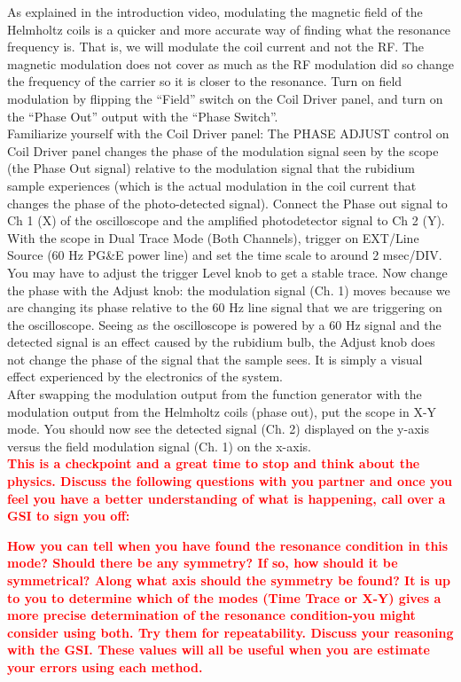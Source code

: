\documentclass{../lab}
\begin{document}
As explained in the introduction video, modulating the magnetic field of the Helmholtz coils is a quicker and more accurate way of finding what the resonance frequency is. That is, we will modulate the coil current and not the RF. The magnetic modulation does not cover as much as the RF modulation did so change the frequency of the carrier so it is closer to the resonance. Turn on field modulation by flipping the ``Field'' switch on the Coil Driver panel, and turn on the ``Phase Out'' output with the ``Phase Switch''. \\

Familiarize yourself with the Coil Driver panel: The PHASE ADJUST control on Coil Driver panel changes the phase of the modulation signal seen by the scope (the Phase Out signal) relative to the modulation signal that the rubidium sample experiences (which is the actual modulation in the coil current that changes the phase of the photo-detected signal). Connect the Phase out signal to Ch 1 (X) of the oscilloscope and the amplified photodetector signal to Ch 2 (Y). With the scope in Dual Trace Mode (Both Channels), trigger on EXT/Line Source (60 Hz PG\&E power line) and set the time scale to around 2 msec/DIV. You may have to adjust the trigger Level knob to get a stable trace. Now change the phase with the Adjust knob: the modulation signal (Ch. 1) moves because we are changing its phase relative to the 60 Hz line signal that we are triggering on the oscilloscope. Seeing as the oscilloscope is powered by a 60 Hz signal and the detected signal is an effect caused by the rubidium bulb, the Adjust knob does not change the phase of the signal that the sample sees. It is simply a visual effect experienced by the electronics of the system. \\

After swapping the modulation output from the function generator with the modulation output from the Helmholtz coils (phase out), put the scope in X-Y mode. You should now see the detected signal (Ch. 2) displayed on the y-axis versus the field modulation signal (Ch. 1) on the x-axis. \\

\noindent\textbf{\textcolor{red}{This is a checkpoint and a great time to stop and think about the physics. Discuss the following questions with you partner and once you feel you have a better understanding of what is happening, call over a GSI to sign you off:}}

\textbf{\textcolor{red}{How you can tell when you have found the resonance condition in this mode? Should there be any symmetry? If so, how should it be symmetrical? Along what axis should the symmetry be found? It is up to you to determine which of the modes (Time Trace or X-Y) gives a more precise determination of the resonance condition-you might consider using both. Try them for repeatability. Discuss your reasoning with the GSI. These values will all be useful when you are estimate your errors using each method.}}
\end{document}
